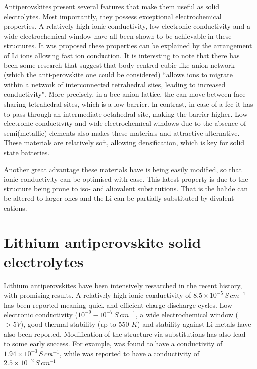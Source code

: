 \documentclass[10pt,a4paper, titlepage]{article}
\begin{document}
Antiperovskites present several features that make them useful as solid electrolytes.
Most importantly, they possess exceptional electrochemical properties. 
A relatively high ionic conductivity, low electronic conductivity and a wide electrochemical window have all been shown to be achievable in these structures.
It was proposed these properties can be explained by the arrangement of Li ions allowing fast ion conduction. \cite{RN5}
It is interesting to note that there has been some research that suggest that body-centred-cubic-like anion network (which the anti-perovskite one could be considered) “allows  ions to migrate within a network of interconnected tetrahedral sites, leading to increased conductivity". \cite{RN5}
More precisely, in a bcc anion lattice, the  can move between face-sharing tetrahedral sites, which is a low barrier. 
In contrast, in case of a fcc it has to pass through an intermediate octahedral site, making the barrier higher.
Low electronic conductivity and wide electrochemical windows due to the absence of semi(metallic) elements also makes these materials and attractive alternative. \cite{RN53}
These materials are relatively soft, allowing densification, which is key for solid state batteries. \cite{RN54}

Another great advantage these materials have is being easily modified, so that ionic conductivity can be optimised with ease. \cite{RN55}
This latest property is due to the structure being prone to iso- and aliovalent substitutions. \cite{RN56}
That is the halide can be altered to larger ones and the Li can be partially substituted by divalent cations. 


\section{Lithium antiperovskite solid electrolytes}
Lithium antiperovskites have been intensively researched in the recent history, with promising results.
A relatively high ionic conductivity of $8.5 \times 10^{-5} \, S \, cm^{-1}$ has been reported meaning quick and efficient charge-discharge cycles. \cite{RN52}
Low electronic conductivity ($10^{-9}-10^{-7} \, S \, cm^{-1}$, a wide electrochemical window ($>5 V$), good thermal stability (up to 550 $K$) and stability against Li metals have also been reported. \cite{RN57}
Modification of the structure via substitutions has also lead to some early success.
For example,  was found to have a conductivity of $1.94 \times 10^{-3} \, S \, cm^{-1}$\cite{RN52}, while  was reported to have a conductivity of $2.5 \times 10^{-2} \, S \, cm^{-1}$ \cite{RN57}
\end{document}
